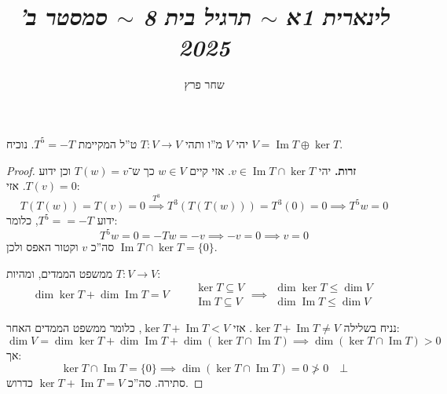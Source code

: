 \documentclass[]{article}
\author{שחר פרץ}
\title{\textit{לינארית 1א $\sim$ תרגיל בית 8 $\sim$ סמסטר ב' {2025}}}
\DeclareMathOperator\Img   {Im}
\newcommand\co        {\colon}
\theoremstyle{definition}
\begin{document}
    \maketitle
    \section{}
    יהי $V$ מ''ו ותהי $T \co V \to V$ ט''ל המקיימת $T^5 = -T$. נוכיח $V = \Img T \oplus \ker T$. \begin{proof}
        \textbf{זרות. }יהי $v \in \Img T \cap \ker T$. אזי קיים $w \in V$ כך ש־$T(w) = v$ וכן ידוע $T(v) = 0$. אזי: 
        \[ T(T(w)) = T(v) = 0 \overset{T^{3}}{\implies} T^{3}(T(T(w))) = T^{3}(0) = 0 \implies T^{5}w = 0 \]
        ידוע $T^5 = =-T$, כלומר: 
        \[ T^5w = 0 = -Tw = -v \implies -v = 0 \implies v = 0 \]
        סה''כ $v$ וקטור האפס ולכן $\Img T \cap \ker T = \{0\}$. 
        
        ממשפט הממדים, ומהיות $T \co V \to V$:  
        \[ \dim \ker T + \dim \Img T = V \quad\quad \begin{aligned}
            \ker T \subseteq V \\
            \Img T \subseteq V
        \end{aligned} \implies \begin{aligned}
            \dim \ker T \le \dim V \\
            \dim \Img T \le \dim V
        \end{aligned} \]
        
        נניח בשלילה $\ker T + \Img T \neq V$. אזי $\ker T + \Img T < V$, כלומר ממשפט הממדים האחר: 
        \[ \dim V = \dim \ker T + \dim \Img T + \dim (\ker T \cap \Img T) \implies \dim (\ker T \cap \Img T) > 0 \]
        אך: 
        \[ \ker T \cap \Img T = \{0\} \implies \dim (\ker T \cap \Img T) = 0 \not > 0 \quad \bot  \]
        סתירה. סה''כ $\ker T + \Img T = V$ כדרוש. 
    \end{proof}
    
\end{document}
